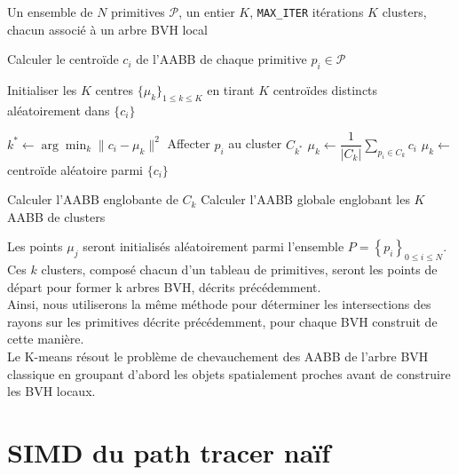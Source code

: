 \begin{algorithm}
\caption{Construction de l'arbre BVH par K-moyennes}
\begin{algorithmic}
\Require Un ensemble de $N$ primitives $\mathcal{P}$, un entier $K$, \texttt{MAX\_ITER} itérations
\Ensure $K$ clusters, chacun associé à un arbre BVH local

\State Calculer le centroïde $c_i$ de l'AABB de chaque primitive $p_i \in \mathcal{P}$

\State Initialiser les $K$ centres $\{\mu_k\}_{1 \leq k \leq K}$ en tirant $K$ centroïdes distincts aléatoirement dans $\{c_i\}$

        \State $k^* \leftarrow \arg\min_k \|c_i - \mu_k\|^2$
        \State Affecter $p_i$ au cluster $C_{k^*}$
    \EndFor
            \State $\mu_k \leftarrow \dfrac{1}{|C_k|}\displaystyle\sum_{p_i \in C_k} c_i$
        \Else
            \State $\mu_k \leftarrow$ centroïde aléatoire parmi $\{c_i\}$
        \EndIf
    \EndFor
\EndFor

    \State Calculer l'AABB englobante de $C_k$
    \State {}
\EndFor
\State Calculer l'AABB globale englobant les $K$ AABB de clusters
\end{algorithmic}
\end{algorithm}

Les points $\mu_j$ seront initialisés aléatoirement parmi l'ensemble $P=\left\{p_i\right\}_{0 \leq i \leq N}$.\\

Ces $k$ clusters, composé chacun d'un tableau de primitives, seront les points de départ pour former k arbres BVH, décrits précédemment.\\

Ainsi, nous utiliserons la même méthode pour déterminer les intersections des rayons sur les primitives décrite précédemment, pour chaque BVH construit de cette manière.\\

Le K-means résout le problème de chevauchement des AABB de l'arbre BVH classique en groupant d'abord les objets spatialement proches avant de construire les BVH locaux.


\section{SIMD du path tracer naïf}

